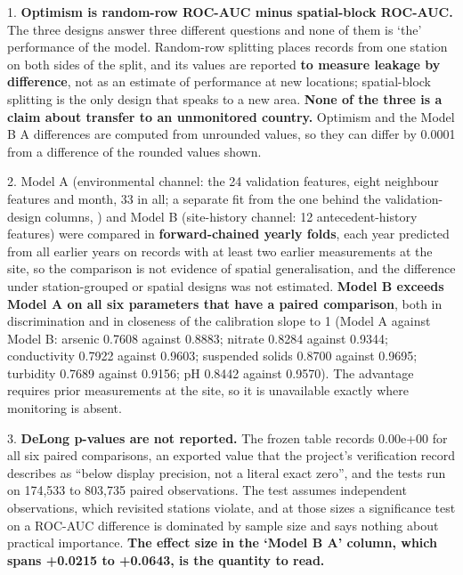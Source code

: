 \documentclass[10pt,letterpaper]{article}
\begin{document}
\begin{table}[!ht]
{\begin{tabular}
\end{tabular}
\begin{flushleft}
1. \textbf{Optimism is random-row ROC-AUC minus spatial-block ROC-AUC.} The three designs answer three different questions and none of them is `the' performance of the model. Random-row splitting places records from one station on both sides of the split, and its values are reported \textbf{to measure leakage by difference}, not as an estimate of performance at new locations; spatial-block splitting is the only design that speaks to a new area. \textbf{None of the three is a claim about transfer to an unmonitored country.} Optimism and the Model B \textminus{} A differences are computed from unrounded values, so they can differ by 0.0001 from a difference of the rounded values shown.

2. Model A (environmental channel: the 24 validation features, eight neighbour features and month, 33 in all; a separate fit from the one behind the validation-design columns, ) and Model B (site-history channel: 12 antecedent-history features) were compared in \textbf{forward-chained yearly folds}, each year predicted from all earlier years on records with at least two earlier measurements at the site, so the comparison is not evidence of spatial generalisation, and the difference under station-grouped or spatial designs was not estimated. \textbf{Model B exceeds Model A on all six parameters that have a paired comparison}, both in discrimination and in closeness of the calibration slope to 1 (Model A against Model B: arsenic 0.7608 against 0.8883; nitrate 0.8284 against 0.9344; conductivity 0.7922 against 0.9603; suspended solids 0.8700 against 0.9695; turbidity 0.7689 against 0.9156; pH 0.8442 against 0.9570). The advantage requires prior measurements at the site, so it is unavailable exactly where monitoring is absent.

3. \textbf{DeLong p-values are not reported.} The frozen table records 0.00e+00 for all six paired comparisons, an exported value that the project's verification record describes as ``below display precision, not a literal exact zero'', and the tests run on 174,533 to 803,735 paired observations. The test assumes independent observations, which revisited stations violate, and at those sizes a significance test on a ROC-AUC difference is dominated by sample size and says nothing about practical importance. \textbf{The effect size in the `Model B \textminus{} A' column, which spans +0.0215 to +0.0643, is the quantity to read.}


\end{flushleft}}
\end{table}
\end{document}
